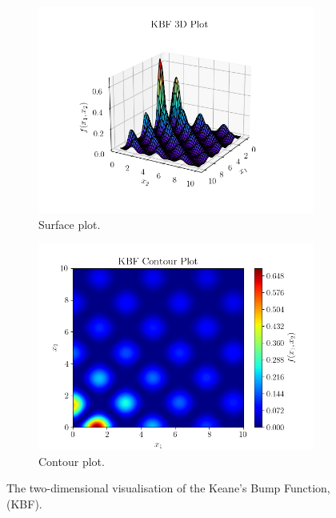 \documentclass[10pt]{article}
\begin{document}
\begin{figure}[H]
\centering
\begin{subfigure}{0.49\textwidth}
    \centering
    \includegraphics[width=\textwidth]{../figures/KBF/KBF_surf.png}
    \caption{Surface plot.}
    \label{fig:KBF_surf}
\end{subfigure}
\begin{subfigure}{0.49\textwidth}
    \centering
    \includegraphics[width=\textwidth]{../figures/KBF/KBF_contour.png}
    \caption{Contour plot.}
    \label{fig:KBF_contour}
\end{subfigure}
    \captionsetup{justification=centering}
    \caption{The two-dimensional visualisation of the Keane's Bump Function, (KBF).}
    \label{fig:KBF_2D}
\end{figure}
\newpage
\end{document}
